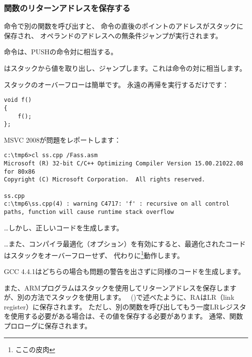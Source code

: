 \subsubsection{関数のリターンアドレスを保存する}


\CALL 命令で別の関数を呼び出すと、 \CALL 命令の直後のポイントのアドレスがスタックに保存され、 
\CALL オペランドのアドレスへの無条件ジャンプが実行されます。

\CALL 命令は、PUSHの命令対に相当する。

\RET はスタックから値を取り出し、ジャンプします。これは命令の対に相当します。

\myindex{\Stack!\MLStackOverflow}
\myindex{\Recursion}
スタックのオーバーフローは簡単です。 永遠の再帰を実行するだけです：


\begin{lstlisting}[style=customc]
void f()
{
	f();
};
\end{lstlisting}

MSVC 2008が問題をレポートします：

\begin{lstlisting}
c:\tmp6>cl ss.cpp /Fass.asm
Microsoft (R) 32-bit C/C++ Optimizing Compiler Version 15.00.21022.08 for 80x86
Copyright (C) Microsoft Corporation.  All rights reserved.

ss.cpp
c:\tmp6\ss.cpp(4) : warning C4717: 'f' : recursive on all control paths, function will cause runtime stack overflow
\end{lstlisting}

\dots しかし、正しいコードを生成します。



\dots また、コンパイラ最適化（\TT{\Ox}オプション）を有効にすると、最適化されたコードはスタックをオーバーフローせず、
代わりに\footnote{ここの皮肉}動作します。



GCC 4.4.1はどちらの場合も問題の警告を出さずに同様のコードを生成します。


また、ARMプログラムはスタックを使用してリターンアドレスを保存しますが、別の方法でスタックを使用します。 
\q{\HelloWorldSectionName}~()で述べたように、\ac{RA}は\ac{LR}（\gls{link register}）に保存されます。 
ただし、別の関数を呼び出してもう一度\ac{LR}レジスタを使用する必要がある場合は、その値を保存する必要があります。 
通常、関数プロローグに保存されます。

